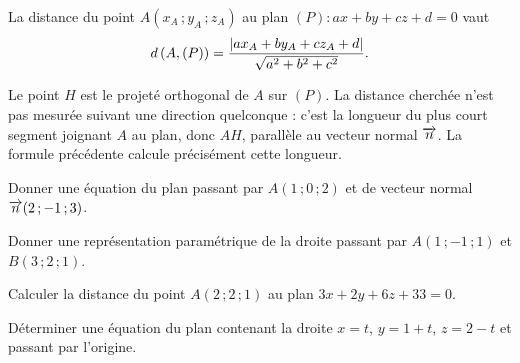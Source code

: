 \begin{propriete}
La distance du point $A(x_{A}\,;y_{A}\,;z_{A})$ au plan
$(P) : ax+by+cz+d = 0$ vaut
\[
  d\left(A,(P)\right)
  = \frac{\left|ax_{A}+by_{A}+cz_{A}+d\right|}{\sqrt{a^{2}+b^{2}+c^{2}}} .
\]
\end{propriete}

\begin{visualisation}
\begin{center}
\end{center}

Le point $H$ est le projeté orthogonal de $A$ sur $(P)$. La distance cherchée
n'est pas mesurée suivant une direction quelconque : c'est la longueur du
plus court segment joignant $A$ au plan, donc $AH$, parallèle au vecteur
normal $\overrightarrow{n}$. La formule précédente calcule précisément cette longueur.
\end{visualisation}

\begin{entrainement}[équations]
\exo[\niveau{1}] Donner une équation du plan passant par $A(1\,;0\,;2)$ et de
vecteur normal $\overrightarrow{n}(2\,;-1\,;3)$.

\exo[\niveau{2}] Donner une représentation paramétrique de la droite passant
par $A(1\,;-1\,;1)$ et $B(3\,;2\,;1)$.

\exo[\niveau{2}] Calculer la distance du point $A(2\,;2\,;1)$ au plan
$3x+2y+6z+33 = 0$.

\exo[\niveau{3}] Déterminer une équation du plan contenant la droite
$x = t$, $y = 1+t$, $z = 2-t$ et passant par l'origine.
\end{entrainement}

